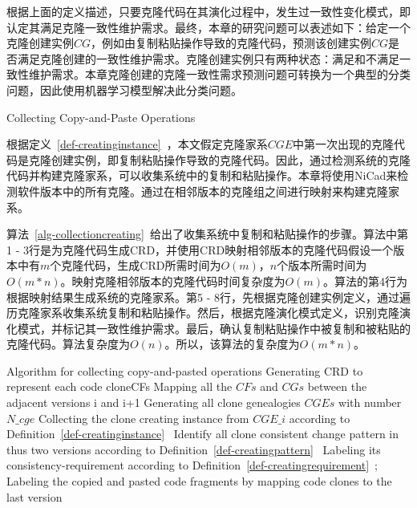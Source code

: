 根据上面的定义描述，只要克隆代码在其演化过程中，发生过一致性变化模式，即认定其满足克隆一致性维护需求。最终，本章的研究问题可以表述如下：给定一个克隆创建实例$CG$，例如由复制粘贴操作导致的克隆代码，预测该创建实例$CG$是否满足克隆创建的一致性维护需求。克隆创建实例只有两种状态：满足和不满足一致性维护需求。本章克隆创建的克隆一致性需求预测问题可转换为一个典型的分类问题，因此使用机器学习模型解决此分类问题。

{Collecting Copy-and-Paste Operations}
\label{lab-checkcopied}

根据定义~\ref{def-creatinginstance}~，本文假定克隆家系$CGE$中第一次出现的克隆代码是克隆创建实例，即复制粘贴操作导致的克隆代码。因此，通过检测系统的克隆代码并构建克隆家系，可以收集系统中的复制和粘贴操作。本章将使用NiCad来检测软件版本中的所有克隆。通过在相邻版本的克隆组之间进行映射来构建克隆家系。

算法~\ref{alg-collectioncreating}~给出了收集系统中复制和粘贴操作的步骤。算法中第1 - 3行是为克隆代码生成CRD，并使用CRD映射相邻版本的克隆代码假设一个版本中有$m$个克隆代码，生成CRD所需时间为$O(m)$，$n$个版本所需时间为$O(m*n)$。映射克隆相邻版本的克隆代码时间复杂度为$O(m)$。算法的第4行为根据映射结果生成系统的克隆家系。第5 - 8行，先根据克隆创建实例定义，通过遍历克隆家系收集系统复制和粘贴操作。然后，根据克隆演化模式定义，识别克隆演化模式，并标记其一致性维护需求。最后，确认复制粘贴操作中被复制和被粘贴的克隆代码。算法复杂度为$O(n)$。所以，该算法的复杂度为$O(m*n)$。

\vspace{1em}
\begin{minipage}{0.8\textwidth}
\centering
\begin{algorithm}[H]
 {Algorithm for collecting copy-and-pasted operations}
\label{alg-collectioncreating}
{ 
 Generating CRD to represent each code clone{CFs}\;
 Mapping all the $CFs$ and $CGs$ between the adjacent versions {i} and {i+1}\;
}
Generating all clone genealogies $CGEs$ with number $N\_cge$\;
{ 
 Collecting the clone creating instance from $CGE\_i$ according to Definition~\ref{def-creatinginstance}~\; 
 Identify all clone consistent change pattern in thus two versions according to Definition~\ref{def-creatingpattern}~\;
 Labeling its consistency-requirement according to Definition~\ref{def-creatingrequirement}~; 
 Labeling the copied and pasted code fragments by mapping code clones to the last version\;
}
\end{algorithm}
\end{minipage}
\vspace{1em}

